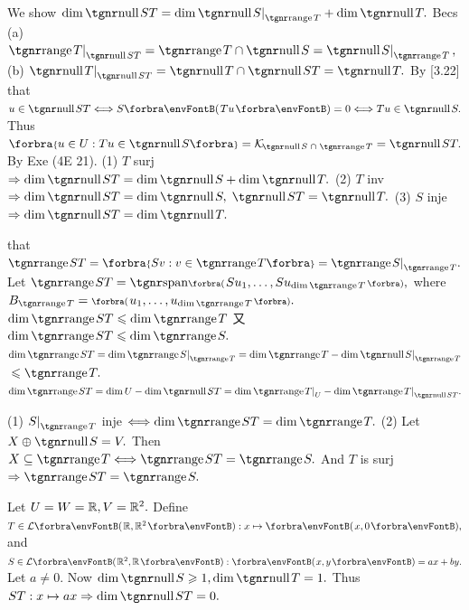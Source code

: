 We show $\dim \null ST=\dim \null S\mmid_{\range T} + \dim \null T.$\parSol{}
Becs (a) \uline{$\range T\mmid_{\null ST}=\range T\cap\null S=\null S\mmid_{\range T}\,,$}\parSol{}
 (b) \uline{$\null T\mmid_{\null ST}=\null T\cap\null ST=\null T.$} By [3.22]\PfEnd\parSol{\vspace{6pt}}
\Or \NOTICE that \uline{$u\in\null ST\Longleftrightarrow S\Par{Tu}=0\Longleftrightarrow Tu\in\null S.$}\parSol{}
\Blind{\Or}Thus \uline{$\Bra{u\in U:Tu\in\null S}=\mathcal{K}_{\!\null S\;\cap\;\range T}=\null ST.$} By Exe (4E 21).\PfEnd\vspace{6pt}
\ACoro (1) $T$ surj $\Rightarrow\dim\null ST=\dim\null S+\dim\null T.$\parCor
(2) $T$ inv $\Rightarrow\dim\null ST=\dim\null S,\;\null ST=\null T.$\parCor
(3) $S$ inje $\Rightarrow\dim\null ST=\dim\null T.$\vspace{-3pt}
\SepLine

\NOTICE that \uline{$\range ST=\Bra{Sv:v\in\range T}=\range S\mmid_{\range T}.$}\parSol{}
Let $\range ST=\Span[\BigPar]{Su_1,\dots,Su_{\dim\range T}},$ where $B_{\range T}=\BigPar{u_1,\dots,u_{\dim\range T}}.$\parSol{}
$\dim\range ST\leqslant \dim\range T$
又 $\dim\range ST\leqslant \dim\range S.$\PfEnd\parSol{\vspace{6pt}}
\Or \uline{$\dim\range ST=\dim\range S\mmid_{\range T}=\dim\range T-\dim\null S\mmid_{\range T}$}${}\leqslant \range T.$\PfEnd\parSol{}
\AComm $\dim\range ST=\dim U-\dim\null ST=\dim \range T\mmid_{U}-\dim\range T\mmid_{\null ST}.$\par\vspace{6pt}
\ACoro (1) $S\mmid_{\range T}$ inje $\Longleftrightarrow\dim\range ST=\dim\range T.$\parCor
(2) Let $X\oplus\null S=V.$ Then $X\subseteq\range T\Longleftrightarrow\range ST=\range S.$\vspace{-2pt}\parCor
{} And $T$ is surj $\Rightarrow\range ST=\range S.$\par\vspace{4pt}
\AExa Let $U=W={\mathbb{R}},V={\mathbb{R}}^2.$ Define $T\in\Lm{\Rbb,\Rbb^2}:x\mapsto\Par{x,0},$ and $S\in\Lm{\Rbb^2,\Rbb}:\Par{x,y}=ax+by.$\parExa
Let $a\neq0.$ Now $\dim\null S\geqslant 1,\dim\null T=1.$ Thus $ST:x\mapsto ax\Rightarrow\dim\null ST=0.$%
\SepLine

